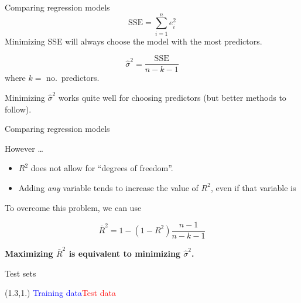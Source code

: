 \documentclass[14pt]{beamer}
\begin{document}
\begin{frame}{Comparing regression models}
\[\text{SSE} = \sum_{i=1}^n e_i^2 \]
Minimizing SSE will always choose the model with the most predictors.

\pause
{}
\[
\hat{\sigma}^2 = \frac{\text{SSE}}{n-k-1}
\]
where $k=$ no.\ predictors.\pause

Minimizing $\hat{\sigma}^2$ works quite well for choosing predictors (but better methods to follow).

\end{frame}


\begin{frame}{Comparing regression models}

However \dots
\begin{itemize}
\item $R^2$  does not allow for ``degrees of freedom''.

\item Adding \textit{any} variable tends to increase the value of $R^2$, even if that variable is
\end{itemize}\pause

To overcome   this problem, we can use 
\begin{block}{}
\[
\bar{R}^2 = 1-(1-R^2)\frac{n-1}{n-k-1}
\]
\end{block}
\pause

\centerline{\textcolor[rgb]{0.8,0.00,0.00}{\textbf{Maximizing $\bar{R}^2$ is equivalent to minimizing $\hat\sigma^2$.}}}

\end{frame}


\begin{frame}{Test sets}
\begin{textblock}{12}(1.3,1.)
\textcolor{blue}{Training data}\hspace*{4cm}\textcolor{red}{Test data}
\end{textblock}

\end{frame}
\end{document}
